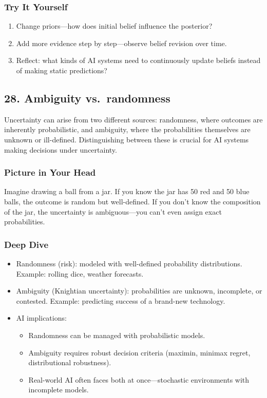 \documentclass[
  letterpaper,
  DIV=11,
  numbers=noendperiod]{scrreprt}
\providecommand{\tightlist}{%
  \setlength{\itemsep}{0pt}\setlength{\parskip}{0pt}}
\begin{document}
\subsubsection{Try It Yourself}\label{try-it-yourself-26}

\begin{enumerate}
\def\labelenumi{\arabic{enumi}.}
\tightlist
\item
  Change priors---how does initial belief influence the posterior?
\item
  Add more evidence step by step---observe belief revision over time.
\item
  Reflect: what kinds of AI systems need to continuously update beliefs
  instead of making static predictions?
\end{enumerate}

\subsection{28. Ambiguity
vs.~randomness}\label{ambiguity-vs.-randomness}

Uncertainty can arise from two different sources: randomness, where
outcomes are inherently probabilistic, and ambiguity, where the
probabilities themselves are unknown or ill-defined. Distinguishing
between these is crucial for AI systems making decisions under
uncertainty.

\subsubsection{Picture in Your Head}\label{picture-in-your-head-27}

Imagine drawing a ball from a jar. If you know the jar has 50 red and 50
blue balls, the outcome is random but well-defined. If you don't know
the composition of the jar, the uncertainty is ambiguous---you can't
even assign exact probabilities.

\subsubsection{Deep Dive}\label{deep-dive-27}

\begin{itemize}
\item
  Randomness (risk): modeled with well-defined probability
  distributions. Example: rolling dice, weather forecasts.
\item
  Ambiguity (Knightian uncertainty): probabilities are unknown,
  incomplete, or contested. Example: predicting success of a brand-new
  technology.
\item
  AI implications:

  \begin{itemize}
  \tightlist
  \item
    Randomness can be managed with probabilistic models.
  \item
    Ambiguity requires robust decision criteria (maximin, minimax
    regret, distributional robustness).
  \item
    Real-world AI often faces both at once---stochastic environments
    with incomplete models.
  \end{itemize}
\end{itemize}
\end{document}
